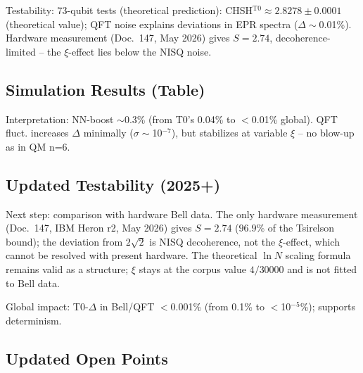 	Testability: 73-qubit tests (theoretical prediction): CHSH$^{\text{T0}} \approx 2.8278 \pm 0.0001$ (theoretical value); QFT noise explains deviations in EPR spectra ($\Delta\sim$0.01\%). Hardware measurement (Doc.~147, May 2026) gives $S = 2.74$, decoherence-limited -- the $\xi$-effect lies below the NISQ noise.
	
	\subsection{Simulation Results (Table)}
	
	\begin{table}[ht]
		\centering
	\end{table}
	
	Interpretation: NN-boost $\sim$0.3\% (from T0's 0.04\% to $<$0.01\% global). QFT fluct. increases $\Delta$ minimally ($\sigma\sim$10$^{-7}$), but stabilizes at variable $\xi$ – no blow-up as in QM n=6.
	
	\subsection{Updated Testability (2025+)}
	
	Next step: comparison with hardware Bell data. The only hardware measurement (Doc.~147, IBM Heron r2, May 2026) gives $S = 2.74$ ($96.9\%$ of the Tsirelson bound); the deviation from $2\sqrt{2}$ is NISQ decoherence, not the $\xi$-effect, which cannot be resolved with present hardware. The theoretical $\ln N$ scaling formula remains valid as a structure; $\xi$ stays at the corpus value $4/30000$ and is not fitted to Bell data.
	
	Global impact: T0-$\Delta$ in Bell/QFT $<$0.001\% (from 0.1\% to $<$10$^{-5}$\%); supports determinism.
	
	\subsection{Updated Open Points}
	
